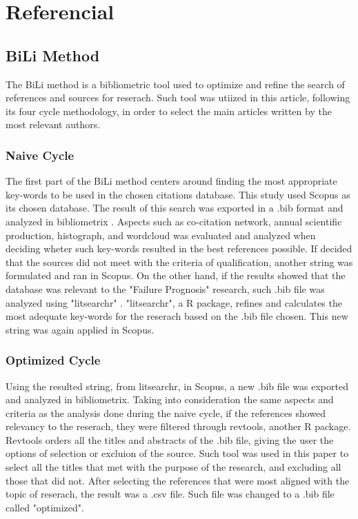 \section{Referencial}

\subsection{BiLi Method}
The BiLi method is a bibliometric tool used to optimize and refine the search of references and sources for reserach. Such tool was utiized in this article, following its four cycle methodology, in order to select the main articles written by the most relevant authors.

\subsubsection{Naive Cycle}
The first part of the BiLi method centers around finding the most appropriate key-words to be used in the chosen citations database. This study used Scopus as its chosen database.
The result of this search was exported in a .bib format and analyzed in bibliometrix \cite{biblio2017}. Aspects such as co-citation network, annual scientific production,  histograph, and wordcloud was evaluated and analyzed when deciding wheter such key-words resulted in the best references possible.
If decided that the sources did not meet with the criteria of qualification, another string was formulated and ran in Scopus.
On the other hand, if the results showed that the database was relevant to the "Failure Prognosis" research, such .bib file was analyzed using "litsearchr" \cite{grames2019automated}.
"litsearchr", a R package, refines and calculates the most adequate key-words for the reserach based on the .bib file chosen. This new string was again applied in Scopus.

\subsubsection{Optimized Cycle}
Using the resulted string, from litsearchr, in Scopus, a new .bib file was exported and analyzed in bibliometrix. Taking into consideration the same aspects and criteria as the analysis done during the naive cycle, if the references showed relevancy to the reserach, they were filtered through revtools, another R package.
Revtools orders all the titles and abstracts of the .bib file, giving the user the options of selection or excluion of the source. Such tool was used in this paper to select all the titles that met with the purpose of the research, and excluding all those that did not.
After selecting the references that were most aligned with the topic of reserach, the result was a .csv file. Such file was changed to a .bib file called "optimized".

